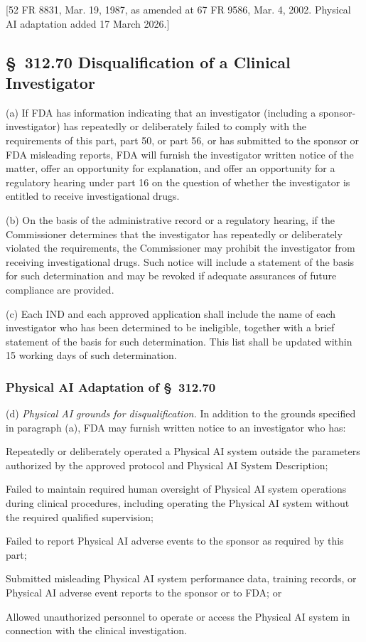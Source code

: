 \documentclass[11pt]{article}
\begin{document}
[52 FR 8831, Mar. 19, 1987, as amended at 67 FR 9586, Mar. 4, 2002. Physical AI adaptation added 17 March 2026.]

\subsection{\S~312.70 Disqualification of a Clinical Investigator}

(a) If FDA has information indicating that an investigator (including a sponsor-investigator) has repeatedly or deliberately failed to comply with the requirements of this part, part 50, or part 56, or has submitted to the sponsor or FDA misleading reports, FDA will furnish the investigator written notice of the matter, offer an opportunity for explanation, and offer an opportunity for a regulatory hearing under part 16 on the question of whether the investigator is entitled to receive investigational drugs.

(b) On the basis of the administrative record or a regulatory hearing, if the Commissioner determines that the investigator has repeatedly or deliberately violated the requirements, the Commissioner may prohibit the investigator from receiving investigational drugs. Such notice will include a statement of the basis for such determination and may be revoked if adequate assurances of future compliance are provided.

(c) Each IND and each approved application shall include the name of each investigator who has been determined to be ineligible, together with a brief statement of the basis for such determination. This list shall be updated within 15 working days of such determination.

\subsubsection{Physical AI Adaptation of \S~312.70}

(d) \textit{Physical AI grounds for disqualification.} In addition to the grounds specified in paragraph (a), FDA may furnish written notice to an investigator who has:

\begin{description}[leftmargin=0.8cm,style=sameline]
\item[(i)] Repeatedly or deliberately operated a Physical AI system outside the parameters authorized by the approved protocol and Physical AI System Description;
\item[(ii)] Failed to maintain required human oversight of Physical AI system operations during clinical procedures, including operating the Physical AI system without the required qualified supervision;
\item[(iii)] Failed to report Physical AI adverse events to the sponsor as required by this part;
\item[(iv)] Submitted misleading Physical AI system performance data, training records, or Physical AI adverse event reports to the sponsor or to FDA; or
\item[(v)] Allowed unauthorized personnel to operate or access the Physical AI system in connection with the clinical investigation.
\end{description}
\end{document}
